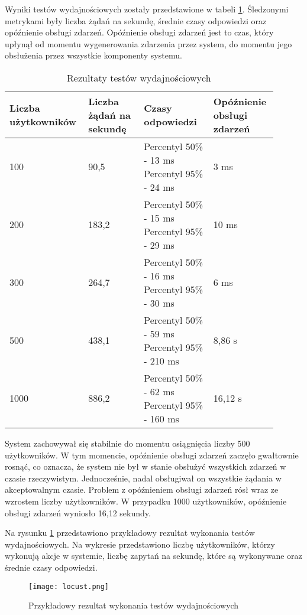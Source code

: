 Wyniki testów wydajnościowych zostały przedstawione w tabeli \ref{table:performance}. Śledzonymi metrykami były liczba żądań na sekundę, średnie czasy odpowiedzi oraz opóźnienie obsługi zdarzeń. Opóźnienie obsługi zdarzeń jest to czas, który upłynął od momentu wygenerowania zdarzenia przez system, do momentu jego obsłużenia przez wszystkie komponenty systemu.

\begin{longtable}{| m{0.25\linewidth} | m{0.2\linewidth} | m{0.25\linewidth} | m{0.2\linewidth} |}
    \caption{Rezultaty testów wydajnościowych}
    \label{table:performance} \\

    \hline
    Liczba użytkowników & Liczba żądań na sekundę & Czasy odpowiedzi & Opóźnienie obsługi zdarzeń \\ \hline\hline \endfirsthead \endfoot
    \hline \endlastfoot

    100 & 90,5 & Percentyl 50\% - 13 ms \newline Percentyl 95\% - 24 ms & 3 ms \\ \hline
    200 & 183,2 & Percentyl 50\% - 15 ms \newline Percentyl 95\% - 29 ms & 10 ms \\ \hline
    300 & 264,7 & Percentyl 50\% - 16 ms \newline Percentyl 95\% - 30 ms & 6 ms \\ \hline
    500 & 438,1 & Percentyl 50\% - 59 ms \newline Percentyl 95\% - 210 ms & 8,86 s \\ \hline
    1000 & 886,2 & Percentyl 50\% - 62 ms \newline Percentyl 95\% - 160 ms & 16,12 s \\ \hline
\end{longtable}

System zachowywał się stabilnie do momentu osiągnięcia liczby 500 użytkowników. W tym momencie, opóźnienie obsługi zdarzeń zaczęło gwałtownie rosnąć, co oznacza, że system nie był w stanie obsłużyć wszystkich zdarzeń w czasie rzeczywistym. Jednocześnie, nadal obsługiwał on wszystkie żądania w akceptowalnym czasie. Problem z opóźnieniem obsługi zdarzeń rósł wraz ze wzrostem liczby użytkowników. W przypadku 1000 użytkowników, opóźnienie obsługi zdarzeń wyniosło 16,12 sekundy.


Na rysunku \ref{fig:locust} przedstawiono przykładowy rezultat wykonania testów wydajnościowych. Na wykresie przedstawiono liczbę użytkowników, którzy wykonują akcje w systemie, liczbę zapytań na sekundę, które są wykonywane oraz średnie czasy odpowiedzi.

\begin{figure}[!h]
    \centering \texttt{[image: locust.png]}
    \caption{Przykładowy rezultat wykonania testów wydajnościowych}
    \label{fig:locust}
\end{figure}